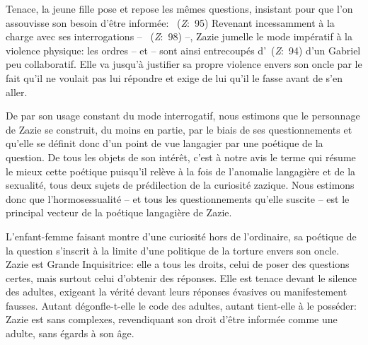 Tenace, la jeune fille pose et repose les mêmes questions, insistant pour que l'on assouvisse son besoin d'être informée: ~(\textit{Z}:~95)
Revenant incessamment à la charge avec ses interrogations -- ~(\textit{Z}:~98) --, Zazie jumelle le mode impératif à la violence physique: les ordres --  et  -- sont ainsi entrecoupés d'~(\textit{Z}:~94) d'un Gabriel peu collaboratif.
Elle va jusqu'à justifier sa propre violence envers son oncle par le fait qu'il ne voulait pas lui répondre et exige de lui qu'il le fasse avant de s'en aller.
\par
De par son usage constant du mode interrogatif, nous estimons que le personnage de Zazie se construit, du moins en partie, par le biais de ses questionnements et qu'elle se définit donc d'un point de vue langagier par une poétique de la question.
De tous les objets de son intérêt, c'est à notre avis le terme  qui résume le mieux cette poétique puisqu'il relève à la fois de l'anomalie langagière et de la sexualité, tous deux sujets de prédilection de la curiosité zazique.
Nous estimons donc que l'hormosessualité -- et tous les questionnements qu'elle suscite -- est le principal vecteur de la poétique langagière de Zazie.
\par
L'enfant-femme faisant montre d'une curiosité hors de l'ordinaire, sa poétique de la question s'inscrit à la limite d'une politique de la torture envers son oncle.
Zazie est Grande Inquisitrice: elle a tous les droits, celui de poser des questions certes, mais surtout celui d'obtenir des réponses.
Elle est tenace devant le silence des adultes, exigeant la vérité devant leurs réponses évasives ou manifestement fausses.
Autant dégonfle-t-elle le code des adultes, autant tient-elle à le posséder: Zazie est sans complexes, revendiquant son droit d'être informée comme une adulte, sans égards à son âge.


